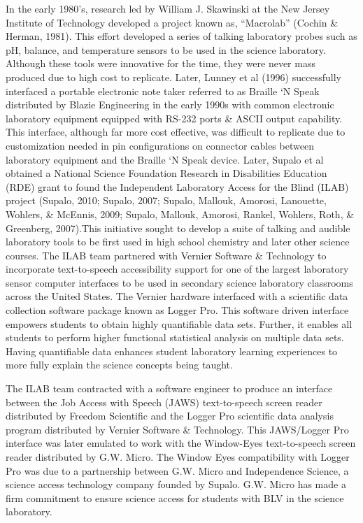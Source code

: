 \documentclass[11.5pt]{sig-alternate} %
\begin{document}
\begin{large}
In the early 1980’s, research led by William J. Skawinski at the New Jersey Institute of Technology developed a project known as, “Macrolab” (Cochin \& Herman, 1981). This effort developed a series of talking laboratory probes such as pH, balance, and temperature sensors to be used in the science laboratory. Although these tools were innovative for the time, they were never mass produced due to high cost to replicate. Later, Lunney et al (1996) successfully interfaced a portable electronic note taker referred to as Braille ‘N Speak distributed by Blazie Engineering in the early 1990s with common electronic laboratory equipment equipped with RS-232 ports \& ASCII output capability. This interface, although far more cost effective, was difficult to replicate due to customization needed in pin configurations on connector cables between laboratory equipment and the Braille ‘N Speak device. Later, Supalo et al obtained a National Science Foundation Research in Disabilities Education (RDE) grant to found the Independent Laboratory Access for the Blind (ILAB) project (Supalo, 2010; Supalo, 2007; Supalo, Mallouk, Amorosi, Lanouette, Wohlers, \& McEnnis, 2009; Supalo, Mallouk, Amorosi, Rankel, Wohlers, Roth, \& Greenberg, 2007).This initiative sought to develop a suite of talking and audible laboratory tools to be first used in high school chemistry and later other science courses. The ILAB team partnered with Vernier Software \& Technology to incorporate text-to-speech accessibility support for one of the largest laboratory sensor computer interfaces to be used in secondary science laboratory classrooms across the United States. The Vernier hardware interfaced with a scientific data collection software package known as Logger Pro. This software driven interface empowers students to obtain highly quantifiable data sets. Further, it enables all students to perform higher functional statistical analysis on multiple data sets. Having quantifiable data enhances student laboratory learning experiences to more fully explain the science concepts being taught. 

The ILAB team contracted with a software engineer to produce an interface between the Job Access with Speech (JAWS) text-to-speech screen reader distributed by Freedom Scientific and the Logger Pro scientific data analysis program distributed by Vernier Software \& Technology. This JAWS/Logger Pro interface was later emulated to work with the Window-Eyes text-to-speech screen reader distributed by G.W. Micro. The Window Eyes compatibility with Logger Pro was due to a partnership between G.W. Micro and Independence Science, a science access technology company founded by Supalo. G.W. Micro has made a firm commitment to ensure science access for students with BLV in the science laboratory.


\end{large}
\end{document}
